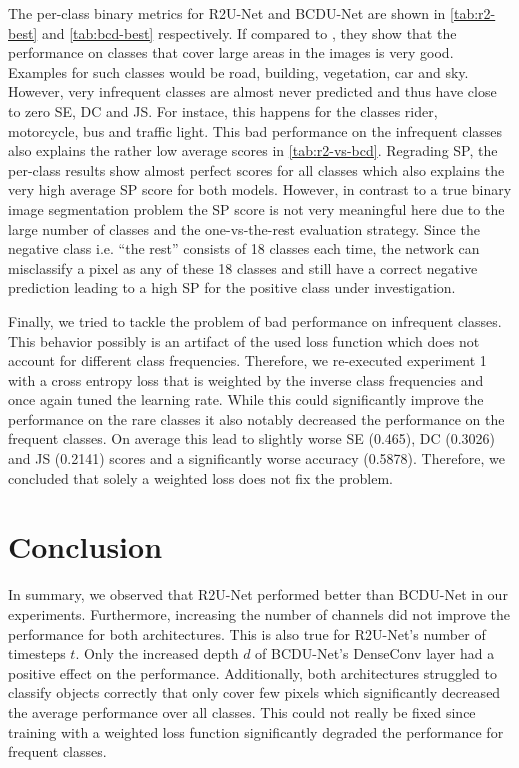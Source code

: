 \documentclass{article}
\begin{document}
The per-class binary metrics for R2U-Net and BCDU-Net are shown in 
\autoref{tab:r2-best} and \autoref{tab:bcd-best} respectively. If compared to 
\autocite[2]{Cordts2016Cityscapes}, they show that the performance on classes 
that cover large areas in the images is very good. Examples for such classes 
would be road, building, vegetation, car and sky. However, very infrequent 
classes are almost never predicted and thus have close to zero SE, DC and JS. 
For instace, this happens for the classes rider, motorcycle, bus and traffic 
light. This bad performance on the infrequent classes also explains the rather 
low average scores in \autoref{tab:r2-vs-bcd}. Regrading SP, the per-class 
results show almost perfect scores for all classes which also explains the very 
high average SP score for both models. However, in contrast to a true binary 
image segmentation problem the SP score is not very meaningful here due to the 
large number of classes and the 
one-vs-the-rest evaluation strategy. Since the negative class i.e. ``the rest'' 
consists of 18 classes each time, the network can misclassify a pixel as any of 
these 18 classes and still have a correct negative prediction leading to a high 
SP for the positive class under investigation.

Finally, we tried to tackle the problem of bad performance on infrequent 
classes. This behavior possibly is an artifact of the used loss function which 
does not account for different class frequencies. Therefore, we re-executed 
experiment 1 with a cross entropy loss that is weighted by the inverse class 
frequencies and once again tuned the learning rate. While this could 
significantly improve the performance on the rare classes it also notably 
decreased the performance on the frequent classes. On average this lead to 
slightly worse SE (0.465), DC (0.3026) and JS (0.2141) scores and a 
significantly worse accuracy (0.5878). Therefore, we concluded that solely a 
weighted loss does not fix the problem.

\section{Conclusion}
\label{sec:conclusion}
In summary, we observed that R2U-Net performed better than BCDU-Net in our 
experiments. Furthermore, increasing the number of channels did not improve the 
performance for both architectures. This is also true for R2U-Net's number of 
timesteps $t$. Only the increased depth $d$ of BCDU-Net's DenseConv layer had a 
positive effect on the performance. Additionally, both architectures struggled 
to classify objects correctly that only cover few pixels which significantly 
decreased the average performance over all classes. This could not really 
be fixed since training with a weighted loss function significantly degraded 
the performance for frequent classes.
\end{document}
